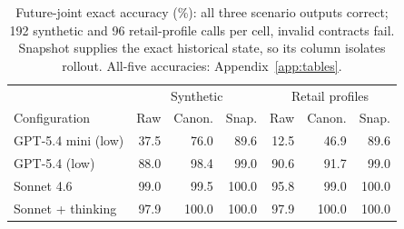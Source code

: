\begin{table}[t]
\centering\footnotesize
\begin{tabular}{lrrrrrr}
\toprule
 & \multicolumn{3}{c}{Synthetic} & \multicolumn{3}{c}{Retail profiles} \\
Configuration & Raw & Canon. & Snap. & Raw & Canon. & Snap. \\
\midrule
GPT-5.4 mini (low) & 37.5 & 76.0 & 89.6 & 12.5 & 46.9 & 89.6 \\
GPT-5.4 (low) & 88.0 & 98.4 & 99.0 & 90.6 & 91.7 & 99.0 \\
Sonnet 4.6 & 99.0 & 99.5 & 100.0 & 95.8 & 99.0 & 100.0 \\
Sonnet + thinking & 97.9 & 100.0 & 100.0 & 97.9 & 100.0 & 100.0 \\
\bottomrule
\end{tabular}
\caption{Future-joint exact accuracy (\%): all three scenario outputs correct; 192 synthetic and 96 retail-profile calls per cell, invalid contracts fail. Snapshot supplies the exact historical state, so its column isolates rollout. All-five accuracies: Appendix~\ref{app:tables}.}
\label{tab:merged}
\end{table}

